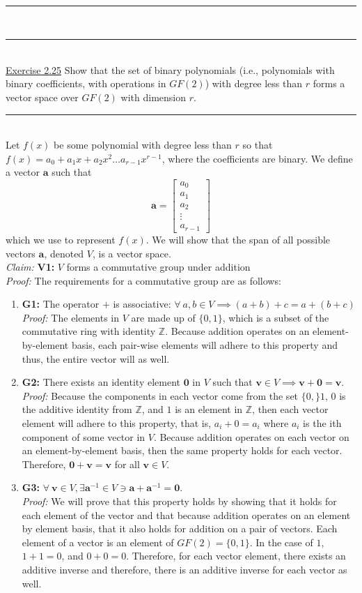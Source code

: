 \documentclass{article}
\newcommand{\problemsep}{\leavevmode\\[0.05in] \rule[\baselineskip/4]{\textwidth}{1pt} \\[0.005in] \rule[\baselineskip]{\textwidth}{1pt}\vspace{-\baselineskip}\leavevmode\\[0.05in]}
\newcommand{\statementsep}{\leavevmode\\[0.005in] \rule[\baselineskip/4]{\textwidth}{0.4pt}\leavevmode\\[0.005in]}
\begin{document}
\problemsep
\noindent\underline{Exercise 2.25}
Show that the set of binary polynomials (i.e., polynomials with binary coefficients, with operations in $GF(2)$) with degree less than $r$ forms a vector space over $GF(2)$ with dimension $r$.
\statementsep
Let $f(x)$ be some polynomial with degree less than $r$ so that $f(x) = a_0 + a_1x + a_2x^2 \hdots a_{r - 1}x^{r - 1}$, where the coefficients are binary. We define a vector $\mathbf{a}$ such that 
\begin{equation*} 
\mathbf{a} = \begin{bmatrix} a_0 \\ a_1 \\ a_2\\ \vdots \\ a_{r - 1}\end{bmatrix}
\end{equation*}
which we use to represent $f(x)$. We will show that the span of all possible vectors $\mathbf{a}$, denoted $V$, is a vector space. \\[0.05in]
{\it Claim: } {\bf V1: } $V$ forms a commutative group under addition \\[0.05in]
{\it Proof: } The requirements for a commutative group are as follows:
\begin{enumerate}
	\item {\bf G1:} The operator $+$ is associative: $\forall \ a,b \in V \implies (a + b) + c = a + (b + c)$ \\[0.05in]
				{\it Proof: } The elements in $V$ are made up of $\{0,1\}$, which is a subset of the commutative ring with identity $\mathbb{Z}$. Because addition operates on an element-by-element basis, each pair-wise elements will adhere to this property and thus, the entire vector will as well.
	\item {\bf G2:} There exists an identity element $\mathbf{0}$ in $V$ such that $\mathbf{v} \in V \implies \mathbf{v} + \mathbf{0} = \mathbf{v}$. \\[0.05in]
				{\it Proof: } Because the components in each vector come from the set $\{0,\}1$, $0$ is the additive identity from $\mathbb{Z}$, and $1$ is an element in $\mathbb{Z}$, then each vector element will adhere to this property, that is, $a_i + 0 = a_i$ where $a_i$ is the ith component of some vector in $V$. Because addition operates on each vector on an element-by-element basis, then the same property holds for each vector. Therefore, $\mathbf{0} + \mathbf{v} = \mathbf{v}$ for all $\mathbf{v} \in V$.
	\item {\bf G3:} $\forall \ \mathbf{v} \in V, \exists \mathbf{a}^{-1} \in V \ni \mathbf{a} + \mathbf{a}^{-1} = \mathbf{0}$. \\[0.05in]
				{\it Proof: } We will prove that this property holds by showing that it holds for each element of the vector and that because addition operates on an element by element basis, that it also holds for addition on a pair of vectors. Each element of a vector is an element of $GF(2) = \{0,1\}$. In the case of $1$, $1 + 1 = 0$, and $0 + 0 = 0$. Therefore, for each vector element, there exists an additive inverse and therefore, there is an additive inverse for each vector as well.
\end{enumerate}
\end{document}
